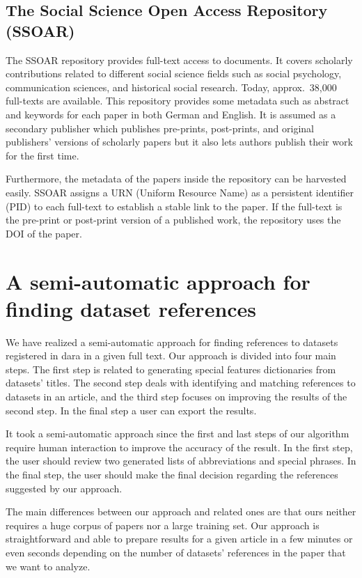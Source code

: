 \documentclass{IOS-Book-Article}
\newcommand{\dara}{\textsf{da\textbar ra}}
\begin{document}
\subsection{The Social Science Open Access Repository (SSOAR)}
The SSOAR repository provides full-text access to documents.
It covers scholarly contributions related to different social science fields such as social psychology, communication sciences, and historical social research.
Today, approx.\ 38,000 full-texts are available.
This repository provides some metadata such as abstract and keywords for each paper in both German and English.
It is assumed as a secondary publisher which publishes pre-prints, post-prints, and original publishers' versions of scholarly papers but it also lets authors publish their work for the first time.

Furthermore, the metadata of the papers inside the repository can be harvested easily.
SSOAR assigns a URN (Uniform Resource Name) as a persistent identifier (PID) to each full-text to establish a stable link to the paper.
If the full-text is the pre-print or post-print version of a published work, the repository uses the DOI of the paper.

\section{A semi-automatic approach for finding dataset references}
\label{sec:approach}
We have realized a semi-automatic approach for finding references to datasets registered in {\dara} in a given full text. 
Our approach is divided into four main steps.
The first step is related to generating special features dictionaries from datasets' titles.
The second step deals with identifying and matching references to datasets in an article, and the third step focuses on improving the results of the second step.
In the final step a user can export the results.

It took a semi-automatic approach since 
the first and last steps of our algorithm require human interaction to improve the accuracy of the result. 
In the first step, the user should review two generated lists of abbreviations and special phrases.
In the final step, the user should make the final decision regarding the references suggested by our approach.

The main differences between our approach and related ones are that ours neither requires a huge corpus of papers nor a large training set.
Our approach is straightforward and able to prepare results for a given article in a few minutes or even seconds depending on the number of datasets' references in the paper that we want to analyze.
\end{document}
